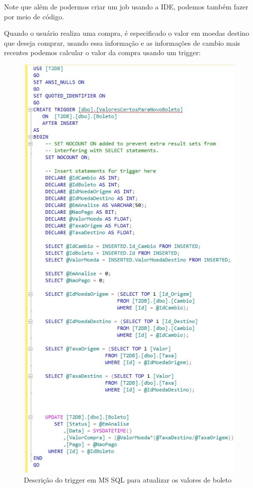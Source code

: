 \documentclass[conference]{IEEEtran}
\begin{document}
  	Note que além de podermos criar um job usando a IDE, podemos também fazer por meio de código.

  	Quando o usuário realiza uma compra, é especificado o valor em moedas destino que deseja comprar, usando essa informação e as informações de cambio mais recentes podemos calcular o valor da compra usando um trigger:

    \begin{figure}[!t]
      \centering
  	  \includegraphics[scale=0.6]{img/trigger.jpg}
      \caption{Descrição do trigger em MS SQL para atualizar os valores de boleto}
    \end{figure} 
\end{document}
